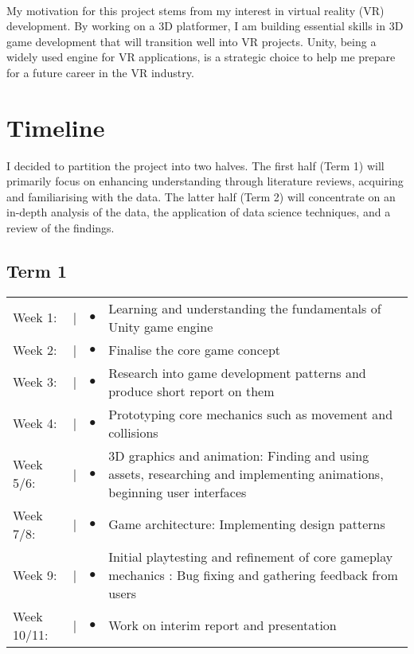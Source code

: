 \documentclass[12pt]{article}
\begin{document}
\paragraph{}
My motivation for this project stems from my interest in virtual reality (VR) development. By working on a 3D platformer, I am building essential skills in 3D game development that will transition well into VR projects. Unity, being a widely used engine for VR applications, is a strategic choice to help me prepare for a future career in the VR industry.



\section{Timeline}
I decided to partition the project into two halves. The first half (Term 1) will primarily focus on enhancing understanding through literature reviews, acquiring and familiarising with the data. The latter half (Term 2) will concentrate on an in-depth analysis of the data, the application of data science techniques, and a review of the findings.

\subsection{Term 1}
\begin{tabular}{@{}p{2cm}@{}>{\raggedright\arraybackslash}p{0.5cm}@{}>{\raggedright\arraybackslash}p{0.5cm}@{}p{12cm}}
Week 1: & \textcolor{black}{|} & $\bullet$ & Learning and understanding the fundamentals of Unity game engine \\
Week 2: & \textcolor{black}{|} & $\bullet$ & Finalise the core game concept \\
Week 3: & \textcolor{black}{|} & $\bullet$ & Research into game development patterns and produce short report on them \\
Week 4: & \textcolor{black}{|} & $\bullet$ & Prototyping core mechanics such as movement and collisions \\
Week 5/6: & \textcolor{black}{|} & $\bullet$ & 3D graphics and animation: Finding and using assets, researching and implementing animations, beginning user interfaces\\
Week 7/8: & \textcolor{black}{|} & $\bullet$ & Game architecture: Implementing design patterns \\
Week 9: & \textcolor{black}{|} & $\bullet$ & Initial playtesting and refinement of core gameplay mechanics : Bug fixing and gathering feedback from users\\
Week 10/11: & \textcolor{black}{|} & $\bullet$ & Work on interim report and presentation \\
\end{tabular}
\end{document}
